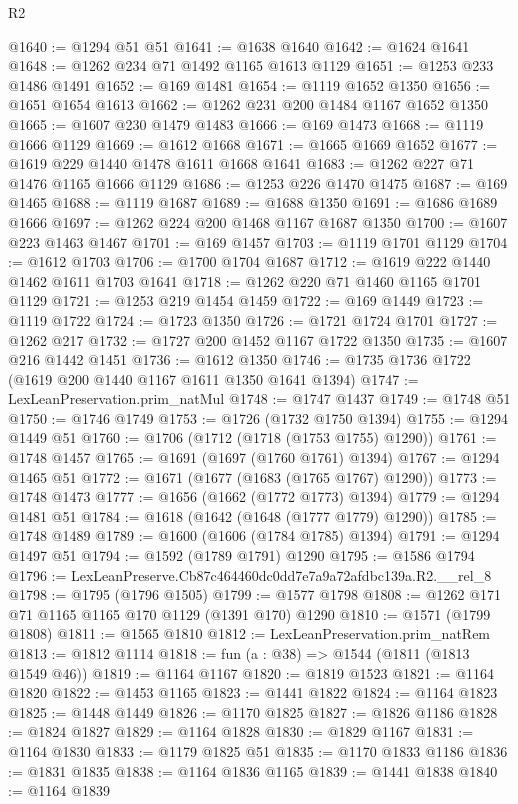 \begin{lexlean}{R2}
\begin{coremodule}
@1640 := @1294 @51 @51
@1641 := @1638 @1640
@1642 := @1624 @1641
@1648 := @1262 @234 @71 @1492 @1165 @1613 @1129
@1651 := @1253 @233 @1486 @1491
@1652 := @169 @1481
@1654 := @1119 @1652 @1350
@1656 := @1651 @1654 @1613
@1662 := @1262 @231 @200 @1484 @1167 @1652 @1350
@1665 := @1607 @230 @1479 @1483
@1666 := @169 @1473
@1668 := @1119 @1666 @1129
@1669 := @1612 @1668
@1671 := @1665 @1669 @1652
@1677 := @1619 @229 @1440 @1478 @1611 @1668 @1641
@1683 := @1262 @227 @71 @1476 @1165 @1666 @1129
@1686 := @1253 @226 @1470 @1475
@1687 := @169 @1465
@1688 := @1119 @1687
@1689 := @1688 @1350
@1691 := @1686 @1689 @1666
@1697 := @1262 @224 @200 @1468 @1167 @1687 @1350
@1700 := @1607 @223 @1463 @1467
@1701 := @169 @1457
@1703 := @1119 @1701 @1129
@1704 := @1612 @1703
@1706 := @1700 @1704 @1687
@1712 := @1619 @222 @1440 @1462 @1611 @1703 @1641
@1718 := @1262 @220 @71 @1460 @1165 @1701 @1129
@1721 := @1253 @219 @1454 @1459
@1722 := @169 @1449
@1723 := @1119 @1722
@1724 := @1723 @1350
@1726 := @1721 @1724 @1701
@1727 := @1262 @217
@1732 := @1727 @200 @1452 @1167 @1722 @1350
@1735 := @1607 @216 @1442 @1451
@1736 := @1612 @1350
@1746 := @1735 @1736 @1722 (@1619 @200 @1440 @1167 @1611 @1350 @1641 @1394)
@1747 := LexLeanPreservation.prim_natMul
@1748 := @1747 @1437
@1749 := @1748 @51
@1750 := @1746 @1749
@1753 := @1726 (@1732 @1750 @1394)
@1755 := @1294 @1449 @51
@1760 := @1706 (@1712 (@1718 (@1753 @1755) @1290))
@1761 := @1748 @1457
@1765 := @1691 (@1697 (@1760 @1761) @1394)
@1767 := @1294 @1465 @51
@1772 := @1671 (@1677 (@1683 (@1765 @1767) @1290))
@1773 := @1748 @1473
@1777 := @1656 (@1662 (@1772 @1773) @1394)
@1779 := @1294 @1481 @51
@1784 := @1618 (@1642 (@1648 (@1777 @1779) @1290))
@1785 := @1748 @1489
@1789 := @1600 (@1606 (@1784 @1785) @1394)
@1791 := @1294 @1497 @51
@1794 := @1592 (@1789 @1791) @1290
@1795 := @1586 @1794
@1796 := LexLeanPreserve.Cb87c464460dc0dd7e7a9a72afdbc139a.R2.__rel_8
@1798 := @1795 (@1796 @1505)
@1799 := @1577 @1798
@1808 := @1262 @171 @71 @1165 @1165 @170 @1129 (@1391 @170) @1290
@1810 := @1571 (@1799 @1808)
@1811 := @1565 @1810
@1812 := LexLeanPreservation.prim_natRem
@1813 := @1812 @1114
@1818 := fun (a : @38) => @1544 (@1811 (@1813 @1549 @46))
@1819 := @1164 @1167
@1820 := @1819 @1523
@1821 := @1164 @1820
@1822 := @1453 @1165
@1823 := @1441 @1822
@1824 := @1164 @1823
@1825 := @1448 @1449
@1826 := @1170 @1825
@1827 := @1826 @1186
@1828 := @1824 @1827
@1829 := @1164 @1828
@1830 := @1829 @1167
@1831 := @1164 @1830
@1833 := @1179 @1825 @51
@1835 := @1170 @1833 @1186
@1836 := @1831 @1835
@1838 := @1164 @1836 @1165
@1839 := @1441 @1838
@1840 := @1164 @1839

\end{coremodule}
\end{lexlean}
